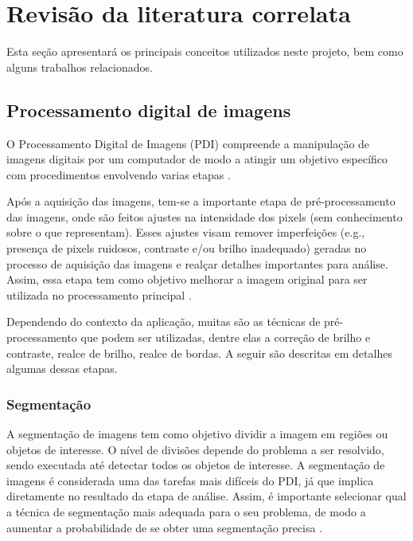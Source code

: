 \documentclass[12pt, a4paper, english, brazil]{article}
\begin{document}
\section{Revisão da literatura correlata}

Esta seção apresentará os principais conceitos utilizados neste projeto, bem como alguns trabalhos relacionados.

\subsection{Processamento digital de imagens}

O Processamento Digital de Imagens (PDI) compreende a manipulação de imagens digitais por um computador de modo a atingir um objetivo específico com procedimentos envolvendo varias etapas \cite{Gonzalez_Woods_2010}.

Após a aquisição das imagens, tem-se a importante etapa de pré-processamento das imagens, onde são feitos ajustes na intensidade dos pixels (sem conhecimento sobre o que representam). Esses ajustes visam remover imperfeições (e.g., presença de pixels ruidosos, contraste e/ou brilho inadequado) geradas no processo de aquisição das imagens e realçar detalhes importantes para análise. Assim, essa etapa tem como objetivo melhorar a imagem original para ser utilizada no processamento principal \cite{Marques_Filho_1999}.

Dependendo do contexto da aplicação, muitas são as técnicas de pré-processamento que podem ser utilizadas, dentre elas a correção de brilho e contraste, realce de brilho, realce de bordas. A seguir são descritas em detalhes algumas dessas etapas.

\subsubsection{Segmentação}

A segmentação de imagens tem como objetivo dividir a imagem em regiões ou objetos de interesse. O nível de divisões depende do problema a ser resolvido, sendo executada até detectar todos os objetos de interesse. A segmentação de imagens é considerada uma das tarefas mais difíceis do PDI, já que implica diretamente no resultado da etapa de análise. Assim, é importante selecionar qual a técnica de segmentação mais adequada para o seu problema, de modo a aumentar a probabilidade de se obter uma segmentação precisa \cite{Gonzalez_Woods_2010}.
\end{document}
